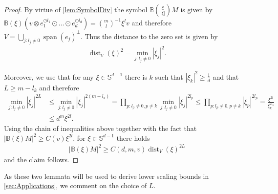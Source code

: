 \documentclass[a4paper, 10pt, twoside, notitlepage]{amsart}
\theoremstyle{plain}
\DeclareMathOperator{\dist}{dist}
\DeclareMathOperator{\vspan}{span}
\begin{document}
		
		
			\begin{proof}
				By virtue of \cref{lem:SymbolDiv} the symbol $\mathbb{B}(\frac{\xi}{|\xi|})M$ is given by $\mathbb{B}(\xi)(v \otimes e_1^{\odot l_1} \odot \dots \odot e_d^{\odot l_d}) = \binom{m}{l}^{-1} \xi^l v$ and therefore
				$V = \bigcup_{j: l_j \neq 0} \vspan(e_j)^\perp$.  Thus the distance to the zero set is given by
				\begin{align*}
					\dist_V(\xi)^2 = \min_{j: l_j \neq 0} |\xi_j|^2.
				\end{align*}
				
				Moreover, we use that for any $\xi \in \mathbb{S}^{d-1}$ there is $k$ such that $|\xi_k|^2 \geq \frac{1}{d}$ and that $L \geq m - l_k$ and therefore
				\begin{align*}
                                  \min_{j: l_j \neq 0} |\xi_j|^{2L} & \leq \min_{j:l_j \neq 0} |\xi_j|^{2(m-l_k)} = \prod_{p: l_p \neq 0, p \neq k} \min_{j:l_j \neq 0} |\xi_j|^{2l_p} \leq \prod_{p: l_p \neq 0, p \neq k} |\xi_p|^{2 l_p} = \frac{\xi^{2l}}{\xi_k^{2l_k}}\\
                                  & \leq d^m \xi^{2l}.
				\end{align*}
				Using the chain of inequalities above together with the fact that $|\mathbb{B}(\xi)M|^2 \geq C(v) \xi^{2l}$, for $\xi \in \mathbb{S}^{d-1}$ there holds
				\begin{align*}
					|\mathbb{B}(\xi)M|^2 \geq C(d,m,v) \dist_V(\xi)^{2L}
				\end{align*}
				and the claim follows.
			\end{proof}
		
		
		 As these two lemmata will be used to derive lower scaling bounds in \cref{sec:Applications}, we comment on the choice of $L$.
		 
\end{document}

